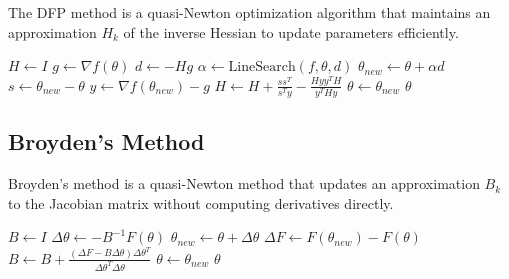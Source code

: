   \begin{algo}
    The DFP method is a quasi-Newton optimization algorithm that maintains an approximation $H_k$ of the inverse Hessian to update parameters efficiently. 
    \begin{algorithm}[H]
    \label{alg:dfp}
    \begin{algorithmic}[1]

        \State $H \gets I$ 
          \State $g \gets \nabla f(\theta)$
          \State $d \gets -H g$
          \State $\alpha \gets \text{LineSearch}(f, \theta, d)$
          \State $\theta_{new} \gets \theta + \alpha d$
          \State $s \gets \theta_{new} - \theta$
          \State $y \gets \nabla f(\theta_{new}) - g$
          \State $H \gets H + \frac{ss^T}{s^T y} - \frac{Hy y^T H}{y^T H y}$
          \State $\theta \gets \theta_{new}$
        \EndWhile
        \State \Return $\theta$
      \EndProcedure
    \end{algorithmic}
    \end{algorithm}
  \end{algo}

\subsection{Broyden's Method}

  \begin{algo}
    Broyden's method is a quasi-Newton method that updates an approximation $B_k$ to the Jacobian matrix without computing derivatives directly. 
    \begin{algorithm}[H]
    \label{alg:broyden}
    \begin{algorithmic}[1]

        \State $B \gets I$ 
          \State $\Delta \theta \gets -B^{-1} F(\theta)$
          \State $\theta_{new} \gets \theta + \Delta \theta$
          \State $\Delta F \gets F(\theta_{new}) - F(\theta)$
          \State $B \gets B + \frac{(\Delta F - B \Delta \theta)\Delta \theta^T}{\Delta \theta^T \Delta \theta}$
          \State $\theta \gets \theta_{new}$
        \EndWhile
        \State \Return $\theta$
      \EndProcedure
    \end{algorithmic}
    \end{algorithm}
  \end{algo}

